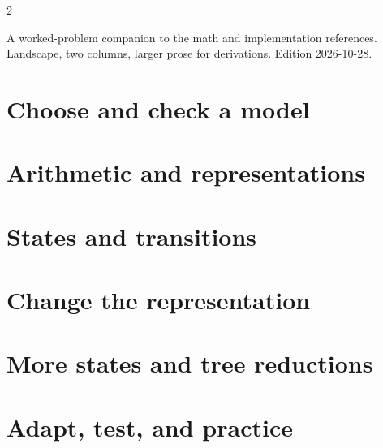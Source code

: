\documentclass[10pt,a4paper,notitlepage]{extreport}
\begin{document}
\begin{multicols*}{2}
\raggedcolumns
{}\par
A worked-problem companion to the math and implementation references.
Landscape, two columns, larger prose for derivations. Edition 2026-10-28.
\tableofcontents
\thispagestyle{fancy}
\chapter{Choose and check a model}

\chapter{Arithmetic and representations}

\chapter{States and transitions}

\chapter{Change the representation}

\chapter{More states and tree reductions}

\chapter{Adapt, test, and practice}

\end{multicols*}
\end{document}
